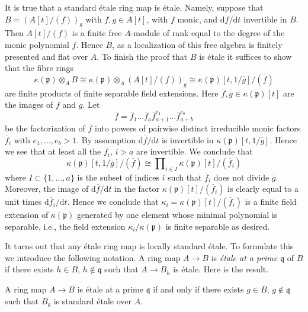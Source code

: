 \noindent
It is true that a standard \'etale ring map is \'etale. Namely, suppose
that $B = \left(A[t]/(f)\right)_g$ with $f, g \in A[t]$, with $f$ monic,
and $\text{d}f/\text{d}t$ invertible in $B$. Then $A[t]/(f)$ is a finite
free $A$-module of rank equal to the degree of the monic polynomial $f$.
Hence $B$, as a localization of this free algebra is finitely presented
and flat over $A$. To finish the proof that $B$ is \'etale it suffices
to show that the fibre rings
$$
\kappa(\mathfrak p) \otimes_A B
\cong
\kappa(\mathfrak p) \otimes_A (A[t]/(f))_g
\cong
\kappa(\mathfrak p)[t, 1/\overline{g}]/(\overline{f})
$$
are finite products of finite separable field extensions.
Here $\overline{f}, \overline{g} \in \kappa(\mathfrak p)[t]$ are
the images of $f$ and $g$. Let
$$
\overline{f} = \overline{f}_1 \ldots \overline{f}_a
\overline{f}_{a + 1}^{e_1} \ldots \overline{f}_{a + b}^{e_b}
$$
be the factorization of $\overline{f}$ into powers of pairwise distinct
irreducible monic factors $\overline{f}_i$ with $e_1, \ldots, e_b > 1$.
By assumption $\text{d}\overline{f}/\text{d}t$ is invertible in
$\kappa(\mathfrak p)[t, 1/\overline{g}]$. Hence we see that
at least all the $\overline{f}_i$, $i > a$ are invertible. We conclude
that
$$
\kappa(\mathfrak p)[t, 1/\overline{g}]/(\overline{f})
\cong
\prod\nolimits_{i \in I} \kappa(\mathfrak p)[t]/(\overline{f}_i)
$$
where $I \subset \{1, \ldots, a\}$ is the subset of indices $i$ such that
$\overline{f}_i$ does not divide $\overline{g}$. Moreover, the image of
$\text{d}\overline{f}/\text{d}t$ in the factor
$\kappa(\mathfrak p)[t]/(\overline{f}_i)$ is clearly equal to a
unit times $\text{d}\overline{f}_i/\text{d}t$. Hence we conclude that
$\kappa_i = \kappa(\mathfrak p)[t]/(\overline{f}_i)$ is a finite field
extension of $\kappa(\mathfrak p)$ generated by one element whose
minimal polynomial is separable, i.e., the field extension
$\kappa_i/\kappa(\mathfrak p)$ is finite separable as desired.

\medskip\noindent
It turns out that any \'etale ring map is locally standard \'etale.
To formulate this we introduce the following notation.
A ring map $A \to B$ is {\it \'etale at a prime $\mathfrak q$} of $B$ if there
exists $h \in B$, $h \not \in \mathfrak q$ such that $A \to B_h$ is \'etale.
Here is the result.

\begin{theorem}
\label{theorem-standard-etale}
A ring map $A \to B$ is \'etale at a prime $\mathfrak q$ if and only if there
exists $g \in B$, $g \not \in \mathfrak q$ such that $B_g$ is standard
\'etale over $A$.
\end{theorem}

